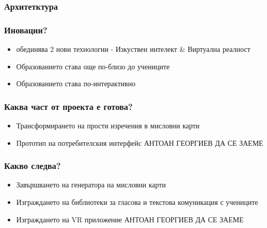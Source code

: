 \documentclass[12pt]{beamer}
\begin{document}
	\begin{frame}
		\frametitle{Архитетктура}
	\end{frame}
	\begin{frame}
		\frametitle{Иновации?}
		\begin{itemize}
			\item обединява 2 нови технологии - Изкуствен интелект \& Виртуална реалност
			\item Образованието става още по-близо до учениците
			\item Образованието става по-интерактивно
		\end{itemize}
	\end{frame}
	\begin{frame}
		\frametitle{Каква част от проекта е готова?}
		\begin{itemize}
			\item Трансформирането на прости изречения в мисловни карти
			\item Прототип на потребителския интерфейс
			АНТОАН ГЕОРГИЕВ ДА СЕ ЗАЕМЕ
		\end{itemize}
	\end{frame}
	\begin{frame}
		\frametitle{Какво следва?}
		\begin{itemize}
			\item Завършването на генератора на мисловни карти
			\item Изграждането на библиотеки за гласова и текстова комуникация с учениците
			\item Изграждането на VR приложение
			АНТОАН ГЕОРГИЕВ ДА СЕ ЗАЕМЕ
		\end{itemize}
	\end{frame}
\end{document}
